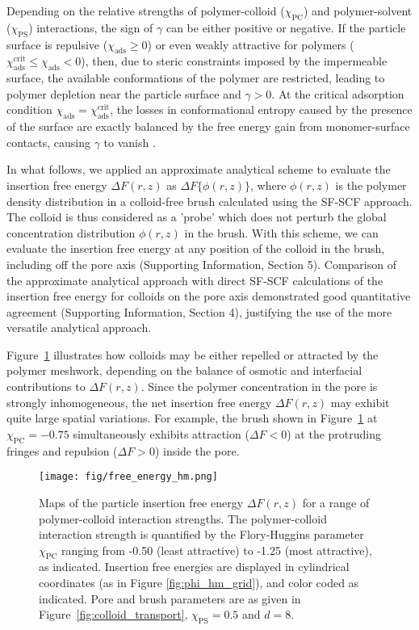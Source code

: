 \documentclass[12pt, a4paper]{article}
\begin{document}
Depending on the relative strengths of polymer-colloid ($\chi_{\text{PC}}$) and polymer-solvent ($\chi_{\text{PS}}$) interactions, the sign of $\gamma$ can be either positive or negative.
If the particle surface is repulsive ($\chi_{\text{ads}} \geq 0$) or even weakly attractive for polymers ($\chi_{\text{ads}}^{\text{crit}} \leq \chi_{\text{ads}} < 0$), then, due to steric constraints imposed by the impermeable surface, the available conformations of the polymer are restricted, leading to polymer depletion near the particle surface and $\gamma > 0$.
At the critical adsorption condition $\chi_{\text{ads}} = \chi_{\text{ads}}^{\text{crit}}$, the losses in conformational entropy caused by the presence of the surface are exactly balanced by the free energy gain from monomer-surface contacts, causing $\gamma$ to vanish \cite{Fleer1993,Birshtein1979,Birshtein1983,Eisenriegler1982}.

In what follows, we applied an approximate analytical scheme to evaluate the insertion free energy $\Delta F(r,z)$ as $\Delta F\{\phi(r,z)\}$, where $\phi(r,z)$ is the polymer density distribution in a colloid-free brush calculated using the SF-SCF approach.
The colloid is thus considered as a 'probe' which does not perturb the global concentration distribution $\phi(r,z)$ in the brush.
With this scheme, we can evaluate the insertion free energy at any position of the colloid in the brush, including off the pore axis (Supporting Information, Section 5).
Comparison of the approximate analytical approach with direct SF-SCF calculations of the insertion free energy for colloids on the pore axis demonstrated good quantitative agreement (Supporting Information, Section 4), justifying the use of the more versatile analytical approach.

Figure~\ref{fig:DeltaF_map} illustrates how colloids may be either repelled or attracted by the polymer meshwork, depending on the balance of osmotic and interfacial contributions to $\Delta F(r,z)$.
Since the polymer concentration in the pore is strongly inhomogeneous, the net insertion free energy $\Delta F(r,z)$ may exhibit quite large spatial variations.
For example, the brush shown in Figure~\ref{fig:DeltaF_map} at $\chi_{\text{PC}}=-0.75$ simultaneously exhibits attraction ($\Delta F<0$) at the protruding fringes and repulsion ($\Delta F>0$) inside the pore.

\begin{figure}
    \centering
    \texttt{[image: fig/free\_energy\_hm.png]}
    \caption{
    Maps of the particle insertion free energy $\Delta F(r,z)$ for a range of polymer-colloid interaction strengths.
    The polymer-colloid interaction strength is quantified by the Flory-Huggins parameter $\chi_{\text{PC}}$ ranging from -0.50 (least attractive) to -1.25 (most attractive), as indicated.
    Insertion free energies are displayed in cylindrical coordinates (as in Figure \ref{fig:phi_hm_grid}), and color coded as indicated.
    Pore and brush parameters are as given in Figure~\ref{fig:colloid_transport}, $\chi_{\text{PS}}=0.5$ and $d=8$.
    }
    \label{fig:DeltaF_map}
\end{figure}
\end{document}
